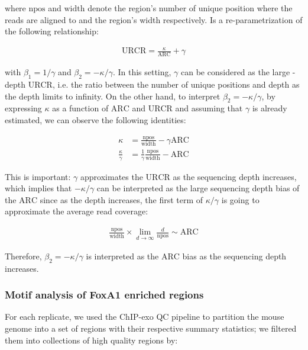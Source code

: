 \documentclass{bmcart}\usepackage[]{graphicx}\usepackage[]{color}
\begin{document}
where $\mbox{npos}$ and $\mbox{width}$ denote the region's number of
unique position where the reads are aligned to and the region's width
respectively. Is a re-parametrization of the following relationship:

\begin{align}
  \mbox{URCR} = \frac{\kappa}{\mbox{ARC}} + \gamma
\label{mod}
\end{align}

with $\beta_1 = 1 / \gamma$ and $\beta_2 = - \kappa / \gamma$. In this
setting, $\gamma$ can be considered as the large - depth
$\mbox{URCR}$, i.e. the ratio between the number of unique positions
and depth as the depth limits to infinity. On the other hand, to
interpret $\beta_2 = - \kappa / \gamma $, by expressing $\kappa$ as a
function of $\mbox{ARC}$ and $\mbox{URCR}$ and assuming that $\gamma$
is already estimated, we can observe the following identities:

\begin{align*}
  \kappa &= \frac{\mbox{npos}}{\mbox{width}} - \gamma \mbox{ARC} \\
  \frac{\kappa}{\gamma} &= \frac{1}{\gamma} \frac{\mbox{npos}}{\mbox{width}} - \mbox{ARC} 
\end{align*}

This is important: $\gamma$ approximates the $\mbox{URCR}$ as the
sequencing depth increases, which implies that $- \kappa / \gamma$ can
be interpreted as the large sequencing depth bias of the $\mbox{ARC}$
since as the depth increases, the first term of $\kappa / \gamma$ is
going to approximate the average read coverage:

\begin{align*}
  \frac{\mbox{npos}}{\mbox{width}} \times \lim_{d \rightarrow
    \infty} \frac{d }{\mbox{npos}} \sim \mbox{ARC} 
\end{align*}

Therefore, $\beta_2 = - \kappa / \gamma$ is interpreted as the
$\mbox{ARC}$ bias as the sequencing depth increases.


\subsubsection*{Motif analysis of FoxA1 enriched regions}

For each replicate, we used the ChIP-exo QC pipeline to partition the
mouse genome into a set of regions with their respective summary
statistics; we filtered them into collections of high quality regions
by:
\end{document}

